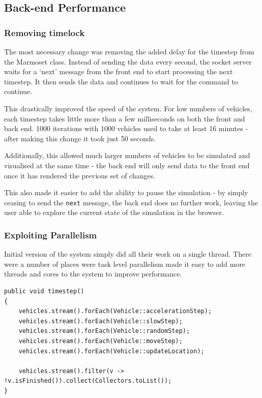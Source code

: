 \documentclass[ %
                    author={Alexander Hill},
                supervisor={Dr. Benjamin Sach},
                    degree={MEng},
                     title={MARMOSET},
                  subtitle={Multi-Agent Route Management using Online Simulation for Efficient Transportation},
                      type={research},
                      year={2016} ]{dissertation}
\begin{document}
\subsection{Back-end Performance}

\subsubsection{Removing timelock}

The most necessary change was removing the added delay for the timestep from the
Marmoset class. Instead of sending the data every second, the socket server
waits for a `next' message from the front end to start processing the next
timestep. It then sends the data and continues to wait for the command to
continue.

This drastically improved the speed of the system. For low numbers of vehicles,
each timestep takes little more than a few milliseconds on both the front and
back end. 1000 iterations with 1000 vehicles used to take at least 16 minutes -
after making this change it took just 50 seconds.

Additionally, this allowed much larger numbers of vehicles to be simulated and
visualised at the same time - the back end will only send data to the front end
once it has rendered the previous set of changes.

This also made it easier to add the ability to pause the simulation - by simply
ceasing to send the \texttt{next} message, the back end does no further work,
leaving the user able to explore the current state of the simulation in the
browser.

\subsubsection{Exploiting Parallelism}

Initial version of the system simply did all their work on a single thread.
There were a number of places were task level parallelism made it easy to add
more threads and cores to the system to improve performance.

\begin{lstlisting}[caption={The single-threaded \texttt{timestep} function},
    label=lst:timestep]
public void timestep()
{
    vehicles.stream().forEach(Vehicle::accelerationStep);
    vehicles.stream().forEach(Vehicle::slowStep);
    vehicles.stream().forEach(Vehicle::randomStep);
    vehicles.stream().forEach(Vehicle::moveStep);
    vehicles.stream().forEach(Vehicle::updateLocation);

    vehicles.stream().filter(v -> !v.isFinished()).collect(Collectors.toList());
}
\end{lstlisting}
\end{document}
